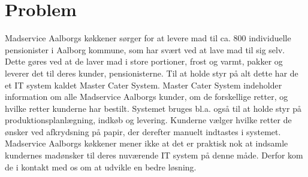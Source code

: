 \chapter{Problem}
Madservice Aalborgs køkkener sørger for at levere mad til ca. 800 individuelle pensionister i Aalborg kommune, som har svært ved at lave mad til sig selv.
Dette gøres ved at de laver mad i store portioner, frost og varmt, pakker og leverer det til deres kunder, pensionisterne.
Til at holde styr på alt dette har de et IT system kaldet Master Cater System.
Master Cater System indeholder information om alle Madservice Aalborgs kunder, om de forskellige retter, og hvilke retter kunderne har bestilt.
Systemet bruges bl.a. også til at holde styr på produktionsplanlægning, indkøb og levering.
Kunderne vælger hvilke retter de ønsker ved afkrydsning på papir, der derefter manuelt indtastes i systemet.
Madservice Aalborgs køkkener mener ikke at det er praktisk nok at indsamle kundernes madønsker til deres nuværende IT system på denne måde.
Derfor kom de i kontakt med os om at udvikle en bedre løsning.





